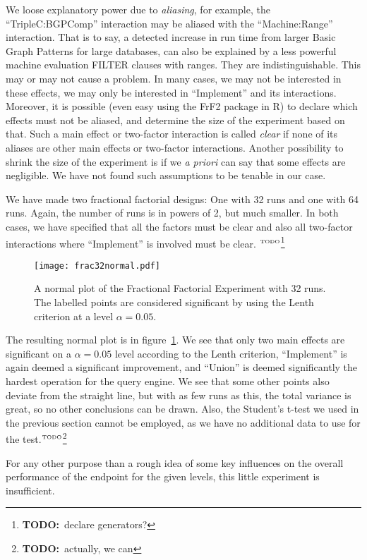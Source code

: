 \documentclass{llncs}
\newcommand{\todo}[1]{\ensuremath{^{\textrm{\tiny{TODO}\normalsize}}}\footnote{\textbf{TODO:}~#1}}
\begin{document}
We loose explanatory power due to \emph{aliasing}, for example, the
``TripleC:BGPComp'' interaction may be aliased with the
``Machine:Range'' interaction. That is to say, a detected increase in
run time from larger Basic Graph Patterns for large databases, can
also be explained by a less powerful machine evaluation FILTER clauses
with ranges. They are indistinguishable. This may or may not cause a
problem. In many cases, we may not be interested in these effects, we
may only be interested in ``Implement'' and its
interactions. Moreover, it is possible (even easy using the FrF2
package in R) to declare which effects must not be aliased, and
determine the size of the experiment based on that. Such a main effect
or two-factor interaction is called \emph{clear} if none of its
aliases are other main effects or two-factor interactions. Another
possibility to shrink the size of the experiment is if we \textit{a
  priori} can say that some effects are negligible. We have not found
such assumptions to be tenable in our case.

We have made two fractional factorial designs: One with 32 runs and
one with 64 runs. Again, the number of runs is in powers of 2, but
much smaller. In both cases, we have specified that all the factors
must be clear and also all two-factor interactions where ``Implement''
is involved must be clear. \todo{declare generators?}

\begin{figure}[hb]
  \texttt{[image: frac32normal.pdf]}
  \caption{A normal plot of the Fractional Factorial Experiment with
    32 runs. The labelled points are considered significant by using
    the Lenth criterion at a level
    $\alpha=0.05$.}\label{fig:frac32normal}
\end{figure}


The resulting normal plot is in figure~\ref{fig:frac32normal}. We see that
only two main effects are significant on a $\alpha = 0.05$ level
according to the Lenth criterion, ``Implement'' is again deemed a
significant improvement, and ``Union'' is deemed significantly the
hardest operation for the query engine. We see that some other points
also deviate from the straight line, but with as few runs as this, the
total variance is great, so no other conclusions can be drawn. Also,
the Student's t-test we used in the previous section cannot be
employed, as we have no additional data to use for the
test.\todo{actually, we can}

For any other purpose than a rough idea of some key influences on the
overall performance of the endpoint for the given levels, this little
experiment is insufficient.
\end{document}
